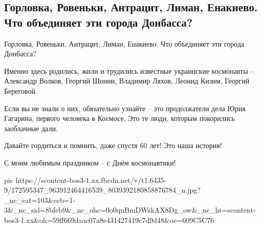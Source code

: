  
 
 
 
 
\subsection{Горловка, Ровеньки, Антрацит, Лиман, Енакиево. Что объединяет эти города Донбасса?}

Горловка, Ровеньки, Антрацит, Лиман, Енакиево. Что объединяет эти города Донбасса? 

Именно здесь родились, жили и трудились известные украинские космонавты –
Александр Волков, Георгий Шонин, Владимир Ляхов, Леонид Кизим, Георгий
Береговой. 

Если вы не знали о них, обязательно узнайте – это продолжатели дела Юрия
Гагарина, первого человека в Космосе. Это те люди, которым покорились
заоблачные дали.

Давайте гордиться и помнить, даже спустя 60 лет! Это наша история!

С моим любимым праздником – с Днём космонавтики!

\ifcmt
  pic https://scontent-bos3-1.xx.fbcdn.net/v/t1.6435-9/172595347_963912464416539_8039392180858876784_n.jpg?_nc_cat=103&ccb=1-3&_nc_sid=8bfeb9&_nc_ohc=0o0qnBmDWzkAX8Dg_ow&_nc_ht=scontent-bos3-1.xx&oh=59ff669daae07a8e431427419c7d9d48&oe=609C5C76
\fi

